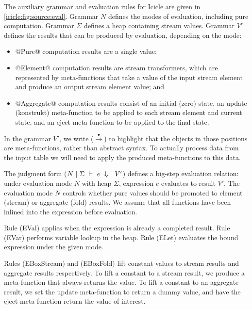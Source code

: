 The auxiliary grammar and evaluation rules for Icicle are given in \cref{icicle:fig:source:eval}.
Grammar $N$ defines the modes of evaluation, including pure computation.
Grammar $\Sigma$ defines a heap containing stream values.
Grammar $V'$ defines the results that can be produced by evaluation, depending on the mode:
\begin{itemize}
\item
@Pure@ computation results are a single value;
\item
@Element@ computation results are stream transformers, which are represented by meta-functions that take a value of the input stream element and produce an output stream element value; and
\item
@Aggregate@ computation results consist of an initial (zero) state, an update (konstrukt) meta-function to be applied to each stream element and current state, and an eject meta-function to be applied to the final state.
\end{itemize}



In the grammar $V'$, we write ($\stackrel{\bullet}{\to}$) to highlight that the objects in those positions are meta-functions, rather than abstract syntax. To actually process data from the input table we will need to apply the produced meta-functions to this data.

The judgment form ($N~|~\Sigma~\vdash~e~\Downarrow~~V'$) defines a big-step evaluation relation: under evaluation mode $N$ with heap $\Sigma$, expression $e$ evaluates to result $V'$.
The evaluation mode $N$ controls whether pure values should be promoted to element (stream) or aggregate (fold) results. 
We assume that all functions have been inlined into the expression before evaluation.

Rule (EVal) applies when the expression is already a completed result.
Rule (EVar) performs variable lookup in the heap.
Rule (ELet) evaluates the bound expression under the given mode.



Rules (EBoxStream) and (EBoxFold) lift constant values to stream results and aggregate results respectively. To lift a constant to a stream result, we produce a meta-function that always returns the value. To lift a constant to an aggregate result, we set the update meta-function to return a dummy value, and have the eject meta-function return the value of interest.

